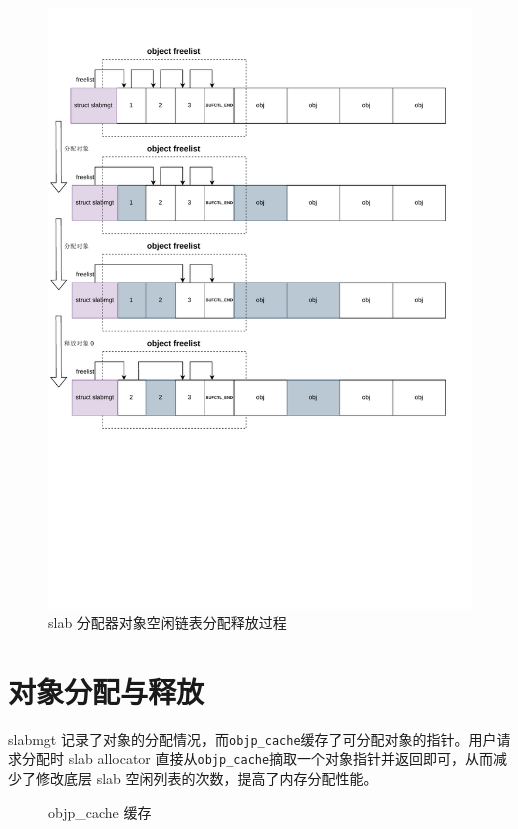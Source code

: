 \documentclass[AutoFakeBold]{LZUThesis}
\begin{document}
\begin{sloppypar}
\begin{figure}[htb]
\centering
\includegraphics[width=500pt]{images/alloc-obj-freelist-management.drawio.pdf}
\caption{slab 分配器对象空闲链表分配释放过程}
\end{figure}


\section{对象分配与释放}

slabmgt
记录了对象的分配情况，而\texttt{objp\_cache}缓存了可分配对象的指针。用户请求分配时
slab allocator
直接从\texttt{objp\_cache}摘取一个对象指针并返回即可，从而减少了修改底层
slab 空闲列表的次数，提高了内存分配性能。

\begin{figure}[htb]
\centering

\caption{objp\_cache 缓存}
\end{figure}


\end{sloppypar}
\end{document}
